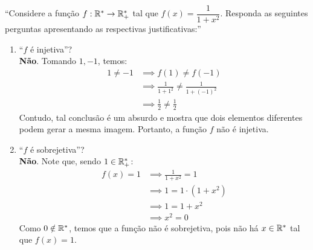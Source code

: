 \enquote{Considere a função $f: \mathbb R^* \rightarrow \mathbb R^*_+$ tal que $f(x) = \dfrac{1}{1 + x^2}$. Responda as seguintes perguntas apresentando as respectivas justificativas:}
\begin{enumerate}
    \item \enquote{$f$ é injetiva}? \\
    \textbf{Não}. Tomando $1, -1$, temos:
    \begin{align*}
        1 \ne -1 &\implies f(1) \ne f(-1) \\ &\implies 
        \frac{1}{1 + 1^2} \ne \frac{1}{1 + (-1)^2} \\ &\implies
        \frac{1}{2} \ne \frac{1}{2}
    \end{align*}
    Contudo, tal conclusão é um absurdo e mostra que dois elementos diferentes podem gerar a mesma imagem. Portanto, a função $f$ não é injetiva.
    \item \enquote{$f$ é sobrejetiva}? \\
    \textbf{Não}. Note que, sendo $1 \in \mathbb R^*_+$:
    \begin{align*}
        f(x) = 1 & \implies \frac{1}{1 + x^2} = 1 \\ & \implies
        1 = 1 \cdot (1 + x^2) \\ & \implies
        1 = 1 + x^2 \\ & \implies
        x^2 = 0
    \end{align*}
    Como $0 \notin \mathbb R^*$, temos que a função não é sobrejetiva, pois não há $x \in \mathbb R^*$ tal que $f(x) = 1$.
\end{enumerate}